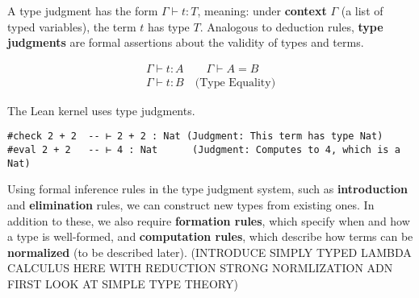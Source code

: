 A type judgment has the form $\Gamma \vdash t : T$,
 meaning: under \textbf{context} $\Gamma$ (a list of typed variables), the term $t$ has type $T$.
Analogous to deduction rules, \textbf{type judgments} are formal assertions about the validity of types and terms.
\begin{example}
    \[
\begin{array}{c}
\Gamma \vdash t : A \qquad \Gamma \vdash A = B \\ [1ex]
\hline
\Gamma \vdash t : B \quad \text{(Type Equality)}
\end{array}
\]
\end{example}
\begin{example}
The Lean kernel uses type judgments.
    \begin{lstlisting}[language=Lean]
#check 2 + 2  -- ⊢ 2 + 2 : Nat (Judgment: This term has type Nat)
#eval 2 + 2   -- ⊢ 4 : Nat      (Judgment: Computes to 4, which is a Nat)

\end{lstlisting}
\end{example}


Using formal inference rules in the type judgment system, such as \textbf{introduction} and \textbf{elimination} 
rules, we can construct new types from existing ones. In addition to these, 
we also require \textbf{formation rules}, which specify when and how a type is well-formed, 
and \textbf{computation rules}, which describe how terms can be \textbf{normalized} (to be described later). 
(INTRODUCE SIMPLY TYPED LAMBDA CALCULUS HERE WITH REDUCTION STRONG NORMLIZATION ADN FIRST LOOK AT SIMPLE TYPE THEORY)
